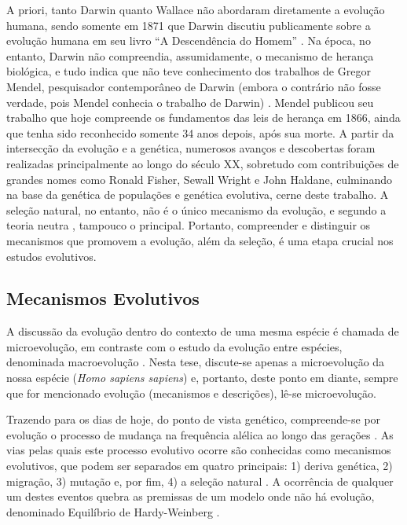 A priori, tanto Darwin quanto Wallace não abordaram diretamente a evolução humana, sendo somente em 1871 que Darwin discutiu publicamente sobre a evolução humana em seu livro “A Descendência do Homem” \cite{darwin_descent_1871}. Na época, no entanto, Darwin não compreendia, assumidamente, o mecanismo de herança biológica, e tudo indica que não teve conhecimento dos trabalhos de Gregor Mendel, pesquisador contemporâneo de Darwin (embora o contrário não fosse verdade, pois Mendel conhecia o trabalho de Darwin) \cite{fairbanks_mendel_2020}. Mendel publicou seu trabalho que hoje compreende os fundamentos das leis de herança em 1866, ainda que tenha sido reconhecido somente 34 anos depois, após sua morte. A partir da intersecção da evolução e a genética, numerosos avanços e descobertas foram realizadas principalmente ao longo do século XX, sobretudo com contribuições de grandes nomes como Ronald Fisher, Sewall Wright e John Haldane, culminando na base da genética de populações e genética evolutiva, cerne deste trabalho. A seleção natural, no entanto, não é o único mecanismo da evolução, e segundo a teoria neutra \cite{kimura_rate_1969}, tampouco o principal. Portanto, compreender e distinguir os mecanismos que promovem a evolução, além da seleção, é uma etapa crucial nos estudos evolutivos.

\subsection{Mecanismos Evolutivos}

A discussão da evolução dentro do contexto de uma mesma espécie é chamada de microevolução, em contraste com o estudo da evolução entre espécies, denominada macroevolução \cite{jobling_human_2014}. Nesta tese, discute-se apenas a microevolução da nossa espécie (\textit{Homo sapiens sapiens}) e, portanto, deste ponto em diante, sempre que for mencionado evolução (mecanismos e descrições), lê-se microevolução. 

Trazendo para os dias de hoje, do ponto de vista genético, compreende-se por evolução o processo de mudança na frequência alélica ao longo das gerações \cite{vitti_detecting_2013}. As vias pelas quais este processo evolutivo ocorre são conhecidas como mecanismos evolutivos, que podem ser separados em quatro principais: 1) deriva genética, 2) migração, 3) mutação e, por fim,  4) a seleção natural \cite{hancock_detecting_2008}. A ocorrência de qualquer um destes eventos quebra as premissas de um modelo onde não há evolução, denominado Equilíbrio de Hardy-Weinberg \cite{templeton_population_2006}.

